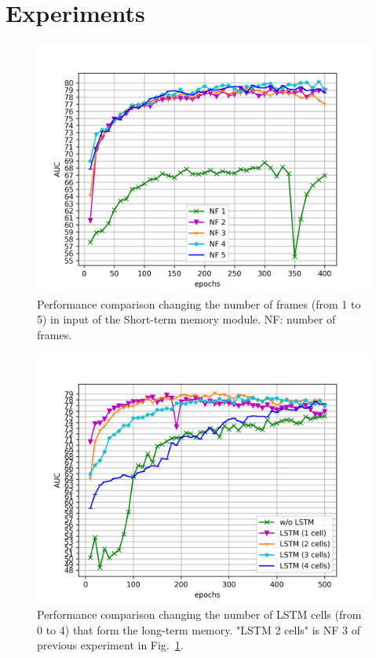 \section{Experiments}
\label{sec:experiments}

\begin{figure}[t]
\centering
	\includegraphics[trim=0 0 0 0, clip, width=1.\linewidth]{images/exp_1.jpg}
	\caption{Performance comparison changing the number of frames (from 1 to 5) in input of the Short-term memory module. NF: number of frames. }
	\label{fig:num-frames-vst}
\end{figure}

\begin{figure}[t]
\centering
	\includegraphics[trim=0 0 0 0, clip, width=1.\linewidth]{images/exp_2.jpg}
	\caption{Performance comparison changing the number of LSTM cells (from 0 to 4) that form the long-term memory. "LSTM 2 cells" is NF 3 of previous experiment in Fig.~\ref{fig:num-frames-vst}.}
	\label{fig:num-memory-cells}
\end{figure}

